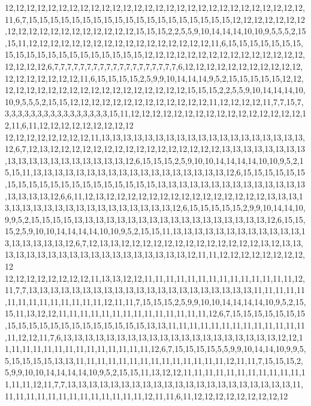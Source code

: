 12,12,12,12,12,12,12,12,12,12,12,12,12,12,12,12,12,12,12,12,12,12,12,12,12,12,12,12,11,6,7,15,15,15,15,15,15,15,15,15,15,15,15,15,15,15,15,15,15,15,12,12,12,12,12,12,12,12,12,12,12,12,12,12,12,12,12,12,12,15,15,15,2,2,5,5,9,10,14,14,14,10,10,9,5,5,5,2,15,15,11,12,12,12,12,12,12,12,12,12,12,12,12,12,12,12,12,12,11,6,15,15,15,15,15,15,15,15,15,15,15,15,15,15,15,15,15,15,15,15,12,12,12,12,12,12,12,12,12,12,12,12,12,12,12,12,12,12,12,6,7,7,7,7,7,7,7,7,7,7,7,7,7,7,7,7,7,7,7,6,12,12,12,12,12,12,12,12,12,12,12,12,12,12,12,12,12,12,11,6,15,15,15,15,2,5,9,9,10,14,14,14,9,5,2,15,15,15,15,15,12,12,12,12,12,12,12,12,12,12,12,12,12,12,12,12,12,12,12,15,15,15,2,2,5,5,9,10,14,14,14,10,10,9,5,5,5,2,15,15,12,12,12,12,12,12,12,12,12,12,12,12,12,11,12,12,12,12,11,7,7,15,7,3,3,3,3,3,3,3,3,3,3,3,3,3,3,3,3,15,11,12,12,12,12,12,12,12,12,12,12,12,12,12,12,12,12,12,11,6,11,12,12,12,12,12,12,12,12,12
12,12,12,12,12,12,12,12,11,13,13,13,13,13,13,13,13,13,13,13,13,13,13,13,13,13,13,13,12,6,7,12,13,12,12,12,12,12,12,12,12,12,12,12,12,12,12,12,12,13,13,13,13,13,13,13,13,13,13,13,13,13,13,13,13,13,13,13,12,6,15,15,15,2,5,9,10,10,14,14,14,14,10,10,9,5,2,15,15,11,13,13,13,13,13,13,13,13,13,13,13,13,13,13,13,13,13,13,12,6,15,15,15,15,15,15,15,15,15,15,15,15,15,15,15,15,15,15,15,15,13,13,13,13,13,13,13,13,13,13,13,13,13,13,13,13,13,13,12,6,6,11,12,13,12,12,12,12,12,12,12,12,12,12,12,12,12,12,12,13,13,13,13,13,13,13,13,13,13,13,13,13,13,13,13,13,13,13,12,6,15,15,15,15,15,2,9,9,10,14,14,10,9,9,5,2,15,15,15,15,13,13,13,13,13,13,13,13,13,13,13,13,13,13,13,13,13,13,12,6,15,15,15,2,5,9,10,10,14,14,14,14,10,10,9,5,2,15,15,11,13,13,13,13,13,13,13,13,13,13,13,13,13,13,13,13,13,13,12,6,7,12,13,13,12,12,12,12,12,12,12,12,12,12,12,12,12,13,12,13,13,13,13,13,13,13,13,13,13,13,13,13,13,13,13,13,13,13,12,11,11,12,12,12,12,12,12,12,12,12
12,12,12,12,12,12,12,12,11,13,13,12,12,11,11,11,11,11,11,11,11,11,11,11,11,11,11,12,11,7,7,13,13,13,13,13,13,13,13,13,13,13,13,13,13,13,13,13,13,13,13,13,11,11,11,11,11,11,11,11,11,11,11,11,11,11,12,11,11,7,15,15,15,2,5,9,9,10,10,14,14,14,14,10,9,5,2,15,15,11,13,12,12,11,11,11,11,11,11,11,11,11,11,11,11,11,11,12,6,7,15,15,15,15,15,15,15,15,15,15,15,15,15,15,15,15,15,15,15,15,13,13,11,11,11,11,11,11,11,11,11,11,11,11,11,11,12,12,11,7,6,13,13,13,13,13,13,13,13,13,13,13,13,13,13,13,13,13,13,13,13,12,12,11,11,11,11,11,11,11,11,11,11,11,11,11,11,12,6,7,15,15,15,15,5,5,9,9,10,14,14,10,9,9,5,5,15,15,15,15,13,13,11,11,11,11,11,11,11,11,11,11,11,11,11,11,12,11,11,7,15,15,15,2,5,9,9,10,10,14,14,14,14,10,9,5,2,15,15,11,13,12,12,11,11,11,11,11,11,11,11,11,11,11,11,11,11,12,11,7,7,13,13,13,13,13,13,13,13,13,13,13,13,13,13,13,13,13,13,13,13,13,11,11,11,11,11,11,11,11,11,11,11,11,11,11,12,11,11,6,11,12,12,12,12,12,12,12,12,12
